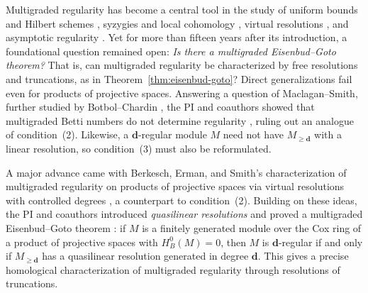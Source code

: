 \documentclass[11pt,reqno]{amsart}
\theoremstyle{remark}
\newcommand{\dd}{\mathbf{d}}
\begin{document}
Multigraded regularity has become a central tool in the study of uniform bounds and Hilbert schemes \cite{maclaganSmith05}, syzygies and local cohomology \cite{sidmanVanTuylWang06,botbolChardin17}, virtual resolutions \cite{BES20,bruceHellerSayrafi26}, and asymptotic regularity \cite{bruceHellerSayrafiSeceleanu25}. Yet for more than fifteen years after its introduction, a foundational question remained open: \emph{Is there a multigraded Eisenbud--Goto theorem?} That is, can multigraded regularity be characterized by free resolutions and truncations, as in Theorem~\ref{thm:eisenbud-goto}? Direct generalizations fail even for products of projective spaces. Answering a question of Maclagan--Smith, further studied by Botbol--Chardin \cite{botbolChardin17}, the PI and coauthors showed that multigraded Betti numbers do not determine regularity \cite[Example~5.1]{bruceHellerSayrafi26}, ruling out an analogue of condition~(2). Likewise, a $\dd$-regular module $M$ need not have $M_{\geq \dd}$ with a linear resolution, so condition~(3) must also be reformulated.

A major advance came with Berkesch, Erman, and Smith's characterization of multigraded regularity on products of projective spaces via virtual resolutions with controlled degrees \cite[Theorem~2.9]{BES20}, a counterpart to condition~(2). Building on these ideas, the PI and coauthors introduced \emph{quasilinear resolutions} and proved a multigraded Eisenbud--Goto theorem \cite{bruceHellerSayrafi26}: if $M$ is a finitely generated module over the Cox ring of a product of projective spaces with $H^0_B(M)=0$, then $M$ is $\dd$-regular if and only if $M_{\geq \dd}$ has a quasilinear resolution generated in degree $\dd$. This gives a precise homological characterization of multigraded regularity through resolutions of truncations.
\end{document}
